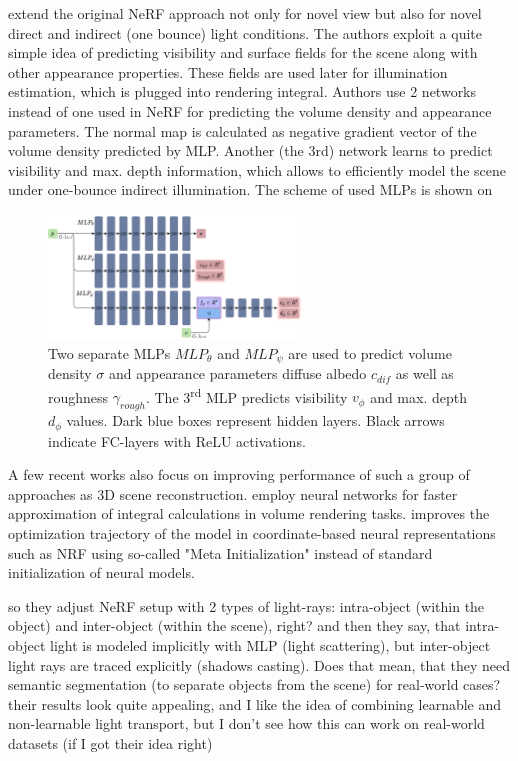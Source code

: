 \documentclass[english]{article}
\newcommand{\rphr}[1]{{\color{blue}#1}}
\begin{document}
\cite{srinivasan2020nerv} extend the original NeRF approach not only for novel view but also for novel direct and indirect (one bounce) light conditions. The authors exploit a quite simple idea of predicting visibility and surface fields for the scene along with other appearance properties. These fields are used later for illumination estimation, which is plugged into rendering integral. Authors use 2 networks instead of one used in NeRF for predicting the volume density and appearance parameters. The normal map is calculated as negative gradient vector of the volume density predicted by MLP. Another (the 3rd) network learns to predict visibility and max. depth information, which allows to efficiently model the scene under one-bounce indirect illumination. The scheme of used MLPs is shown on 

\begin{figure}[t]
    \centering
    \includegraphics[width=0.6\textwidth]{img/mlp_nerv.png}
    \caption{Two separate MLPs $MLP_\theta$ and $MLP_\psi$ are used to predict volume density $\sigma$ and appearance parameters diffuse albedo $c_{dif}$ as well as roughness $\gamma_{rough}$. The 3\textsuperscript{rd} MLP predicts visibility $v_\phi$ and max. depth $d_\phi$ values. Dark blue boxes represent hidden layers. Black arrows indicate FC-layers with ReLU activations.}
    \label{fig:mlp_nerv}
\end{figure}

A few recent works also focus on improving performance of such a group of approaches as 3D scene reconstruction. \cite{lindell2020autoint} employ neural networks for faster approximation of integral calculations in volume rendering tasks. \cite{tancik2020meta} improves the optimization trajectory of the model in coordinate-based neural representations such as NRF using so-called "Meta Initialization" instead of standard initialization of neural models.

\rphr{\cite{guo2020osf} so they adjust NeRF setup with 2 types of light-rays: intra-object (within the object) and inter-object (within the scene), right? and then they say, that intra-object light is modeled implicitly with MLP (light scattering), but inter-object light rays are traced explicitly (shadows casting). Does that mean, that they need semantic segmentation (to separate objects from the scene) for real-world cases? their results look quite appealing, and I like the idea of combining learnable and non-learnable light transport, but I don't see how this can work on real-world datasets (if I got their idea right)}
\end{document}

